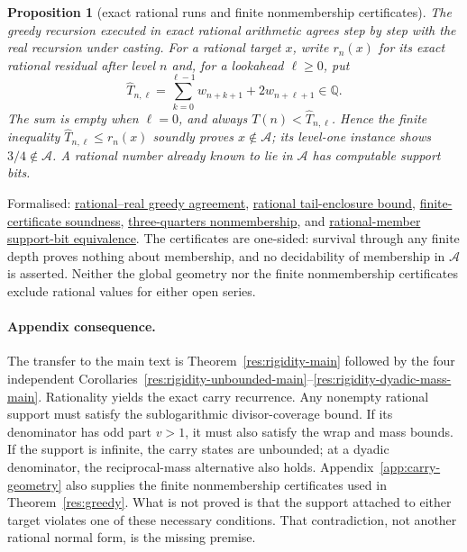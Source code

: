 \documentclass[11pt]{article}
\newcommand{\commit}{bb4e24651b37cd096d3749ef299c3317930b3a3b}
\newcommand{\repobase}{https://github.com/wcook04/plectis-lean-erdos249-257/blob/\commit}
\newcommand{\PK}{Erdos249257}
\newcommand{\lword}[4]{\href{\repobase/\PK/#1\#L#2}{#4}}
\newtheorem{proposition}[theorem]{Proposition}
\theoremstyle{definition}
\theoremstyle{remark}
\newcommand{\Q}{\mathbb{Q}}
\begin{document}
\begin{proposition}[exact rational runs and finite nonmembership certificates]\label{res:death}
The greedy recursion executed in exact rational arithmetic agrees step by step
with the real recursion under casting. For a rational target $x$, write
$r_n(x)$ for its exact rational residual after level $n$ and, for a lookahead
$\ell\ge0$, put
\[
\widehat T_{n,\ell}
  =\sum_{k=0}^{\ell-1}w_{n+k+1}+2w_{n+\ell+1}\in\Q .
\]
The sum is empty when $\ell=0$, and always
$T(n)<\widehat T_{n,\ell}$. Hence the finite inequality
$\widehat T_{n,\ell}\le r_n(x)$ soundly proves $x\notin\mathcal A$; its
level-one instance shows $3/4\notin\mathcal A$. A rational number already
known to lie in $\mathcal A$ has computable support bits.
\end{proposition}
\noindent Formalised:
\lword{GreedyAchievementSet.lean}{1143}{cast_greedyMersenneRemainderRat}{rational--real greedy agreement},
\lword{GreedyAchievementSet.lean}{1728}{mersenneTail_lt_cast_tailUpperRat}{rational tail-enclosure bound},
\lword{GreedyAchievementSet.lean}{1762}{certifiedGreedyMersenneDeath_not_mem}{finite-certificate soundness},
\lword{GreedyAchievementSet.lean}{1784}{three_fourths_not_mem_mersenneAchievementSet}{three-quarters nonmembership},
and \lword{GreedyAchievementSet.lean}{1868}{rational_member_support_bit_iff}{rational-member support-bit equivalence}.
The certificates are one-sided: survival through any finite depth proves
nothing about membership, and no decidability of membership in $\mathcal A$ is
asserted.  Neither the global geometry nor the finite nonmembership certificates
exclude rational values for either open series.

\paragraph{Appendix consequence.}
The transfer to the main text is Theorem~\ref{res:rigidity-main} followed by
the four independent
Corollaries~\ref{res:rigidity-unbounded-main}--\ref{res:rigidity-dyadic-mass-main}.
Rationality yields the exact carry recurrence.  Any nonempty rational support
must satisfy the sublogarithmic divisor-coverage bound.  If its denominator
has odd part \(v>1\), it must also satisfy the wrap and mass bounds.  If the
support is infinite, the carry states are unbounded; at a dyadic denominator,
the reciprocal-mass alternative also holds.
Appendix~\ref{app:carry-geometry} also supplies the finite nonmembership certificates
used in Theorem~\ref{res:greedy}.  What is not proved is that the support attached to
either target violates one of these necessary conditions.  That
contradiction, not another rational normal form, is the missing premise.
\end{document}
